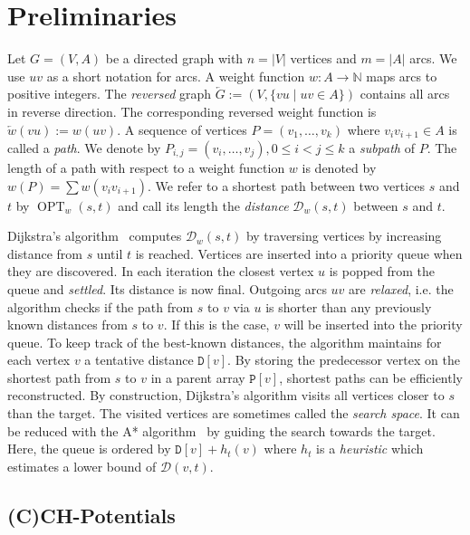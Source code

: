 \documentclass[a4paper,UKenglish,cleveref, autoref, thm-restate]{lipics-v2021}
\newcommand*{\dist}{\mathcal{D}}
\newcommand*{\shp}{\operatorname{OPT}}
\begin{document}
\section{Preliminaries}
\label{sec:prelim}

Let $G=(V,A)$ be a directed graph with $n = |V|$ vertices and $m = |A|$ arcs.
We use $uv$ as a short notation for arcs.
A weight function $w : A \to \mathbb{N}$ maps arcs to positive integers.
The \emph{reversed} graph $\overleftarrow{G} := (V, \{ vu \mid uv \in A \})$ contains all arcs in reverse direction.
The corresponding reversed weight function is $\overleftarrow{w}(vu) := w(uv)$.
A sequence of vertices $P = (v_1, \dots, v_k)$ where $v_i v_{i+1} \in A$ is called a \emph{path}.
We denote by $P_{i,j} = (v_i, \dots, v_j), 0 \leq i < j \leq k$ a \emph{subpath} of $P$.
The length of a path with respect to a weight function $w$ is denoted by $w(P) = \sum w(v_i v_{i+1})$.
We refer to a shortest path between two vertices $s$ and $t$ by $\shp_w(s,t)$ and call its length the \emph{distance} $\dist_w(s,t)$ between $s$ and $t$.

Dijkstra's algorithm~\cite{d-ntpcg-59} computes $\dist_w(s,t)$ by traversing vertices by increasing distance from $s$ until $t$ is reached.
Vertices are inserted into a priority queue when they are discovered.
In each iteration the closest vertex $u$ is popped from the queue and \emph{settled}.
Its distance is now final.
Outgoing arcs $uv$ are \emph{relaxed}, i.e. the algorithm checks if the path from $s$ to $v$ via $u$ is shorter than any previously known distances from $s$ to $v$.
If this is the case, $v$ will be inserted into the priority queue.
To keep track of the best-known distances, the algorithm maintains for each vertex $v$ a tentative distance $\mathtt{D}[v]$.
By storing the predecessor vertex on the shortest path from $s$ to $v$ in a parent array $\mathtt{P}[v]$, shortest paths can be efficiently reconstructed.
By construction, Dijkstra's algorithm visits all vertices closer to $s$ than the target.
The visited vertices are sometimes called the \emph{search space}.
It can be reduced with the A* algorithm~\cite{hnr-afbhd-68} by guiding the search towards the target.
Here, the queue is ordered by $\mathtt{D}[v] + h_t(v)$ where $h_t$ is a \emph{heuristic} which estimates a lower bound of $\dist(v,t)$.

\subsection{(C)CH-Potentials}
\end{document}
